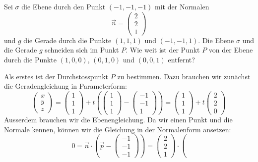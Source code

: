 Sei $\sigma$ die Ebene durch den Punkt $(-1,-1,-1)$ mit der Normalen 
\[
\vec n=\begin{pmatrix}2\\2\\1\end{pmatrix}
\]
und $g$ die Gerade durch die Punkte $(1,1,1)$ und $(-1,-1,1)$.
Die Ebene $\sigma$ und die Gerade $g$ schneiden sich im Punkt $P$.
Wie weit ist der Punkt $P$ von der Ebene durch die Punkte
$(1,0,0)$, $(0,1,0)$ und $(0,0,1)$ entfernt?


\begin{loesung}
Als erstes ist der Durchstosspunkt $P$ zu bestimmen.
Dazu brauchen wir zunächst die Geradengleichung in Parameterform:
\[
\begin{pmatrix} x\\y\\z \end{pmatrix}
=
\begin{pmatrix}1\\1\\1\end{pmatrix}+t
\left(
\begin{pmatrix}1\\1\\1\end{pmatrix}
-
\begin{pmatrix}-1\\-1\\1\end{pmatrix}
\right)
=
\begin{pmatrix}1\\1\\1\end{pmatrix}+t
\begin{pmatrix}2\\2\\0\end{pmatrix}
\]
Ausserdem brauchen wir die Ebenengleichung. Da wir einen Punkt und
die Normale kennen, können wir die Gleichung in der Normalenform
ansetzen:
\[
0=\vec n\cdot \left(\vec p-\begin{pmatrix}-1\\-1\\-1\end{pmatrix}\right)
=
\begin{pmatrix}2\\2\\1\end{pmatrix}\cdot\left(
\]
\end{loesung}
